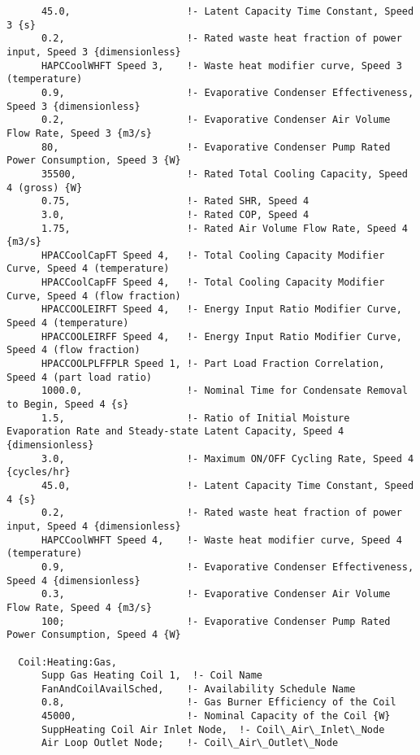 \begin{lstlisting}
      45.0,                    !- Latent Capacity Time Constant, Speed 3 {s}
      0.2,                     !- Rated waste heat fraction of power input, Speed 3 {dimensionless}
      HAPCCoolWHFT Speed 3,    !- Waste heat modifier curve, Speed 3 (temperature)
      0.9,                     !- Evaporative Condenser Effectiveness, Speed 3 {dimensionless}
      0.2,                     !- Evaporative Condenser Air Volume Flow Rate, Speed 3 {m3/s}
      80,                      !- Evaporative Condenser Pump Rated Power Consumption, Speed 3 {W}
      35500,                   !- Rated Total Cooling Capacity, Speed 4 (gross) {W}
      0.75,                    !- Rated SHR, Speed 4
      3.0,                     !- Rated COP, Speed 4
      1.75,                    !- Rated Air Volume Flow Rate, Speed 4 {m3/s}
      HPACCoolCapFT Speed 4,   !- Total Cooling Capacity Modifier Curve, Speed 4 (temperature)
      HPACCoolCapFF Speed 4,   !- Total Cooling Capacity Modifier Curve, Speed 4 (flow fraction)
      HPACCOOLEIRFT Speed 4,   !- Energy Input Ratio Modifier Curve, Speed 4 (temperature)
      HPACCOOLEIRFF Speed 4,   !- Energy Input Ratio Modifier Curve, Speed 4 (flow fraction)
      HPACCOOLPLFFPLR Speed 1, !- Part Load Fraction Correlation, Speed 4 (part load ratio)
      1000.0,                  !- Nominal Time for Condensate Removal to Begin, Speed 4 {s}
      1.5,                     !- Ratio of Initial Moisture Evaporation Rate and Steady-state Latent Capacity, Speed 4 {dimensionless}
      3.0,                     !- Maximum ON/OFF Cycling Rate, Speed 4 {cycles/hr}
      45.0,                    !- Latent Capacity Time Constant, Speed 4 {s}
      0.2,                     !- Rated waste heat fraction of power input, Speed 4 {dimensionless}
      HAPCCoolWHFT Speed 4,    !- Waste heat modifier curve, Speed 4 (temperature)
      0.9,                     !- Evaporative Condenser Effectiveness, Speed 4 {dimensionless}
      0.3,                     !- Evaporative Condenser Air Volume Flow Rate, Speed 4 {m3/s}
      100;                     !- Evaporative Condenser Pump Rated Power Consumption, Speed 4 {W}

  Coil:Heating:Gas,
      Supp Gas Heating Coil 1,  !- Coil Name
      FanAndCoilAvailSched,    !- Availability Schedule Name
      0.8,                     !- Gas Burner Efficiency of the Coil
      45000,                   !- Nominal Capacity of the Coil {W}
      SuppHeating Coil Air Inlet Node,  !- Coil\_Air\_Inlet\_Node
      Air Loop Outlet Node;    !- Coil\_Air\_Outlet\_Node


\end{lstlisting}
